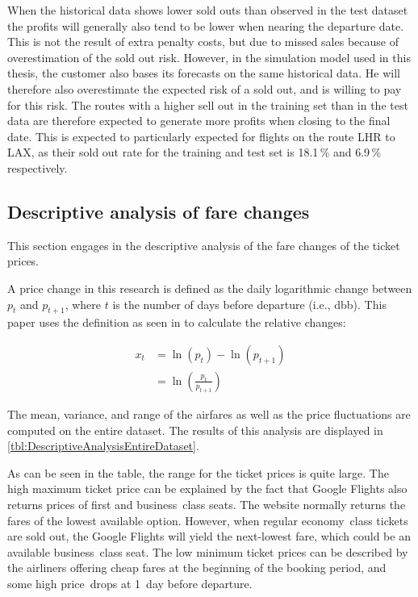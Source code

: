 When the historical data shows lower sold outs than observed in the test dataset the profits will generally also tend to be lower when nearing the departure date. This is not the result of extra penalty costs, but due to missed sales because of overestimation of the sold out risk. However, in the simulation model used in this thesis, the customer also bases its forecasts on the same historical data. He will therefore also overestimate the expected risk of a sold out, and is willing to pay for this risk. The routes with a higher sell out in the training set than in the test data are therefore expected to generate more profits when closing to the final date. This is expected to particularly expected for flights on the route LHR to LAX, as their sold out rate for the training and test set is 18.1\,\% and 6.9\,\% respectively.


\subsection{Descriptive analysis of fare changes}
\label{subsec:DescriptiveAnalysisOfFareChanges}
This section engages in the descriptive analysis of the fare changes of the ticket prices.

A price change in this research is defined as the daily logarithmic change between $p_t$ and $p_{t+1}$, where $t$ is the number of days before departure (i.e., dbb). This paper uses the definition as seen in  to calculate the relative changes:

\begin{equation*}
    \begin{split}
    x_t &= \ln(p_{t}) - \ln({p_{t+1}}) \\
    &= \ln\left( \frac{p_{t}}{p_{t+1}}\right) 
    \end{split}
\end{equation*}


The mean, variance, and range of the airfares as well as the price fluctuations are computed on the entire dataset. The results of this analysis are displayed in \autoref{tbl:DescriptiveAnalysisEntireDataset}.

As can be seen in the table, the range for the ticket prices is quite large. The high maximum ticket price can be explained by the fact that Google Flights also returns prices of first and business~class seats. The website normally returns the fares of the lowest available option. However, when regular economy~class tickets are sold out, the Google Flights will yield the next-lowest fare, which could be an available business~class seat. The low minimum ticket prices can be described by the airliners offering cheap fares at the beginning of the booking period, and some high price~drops at 1~day before departure.

